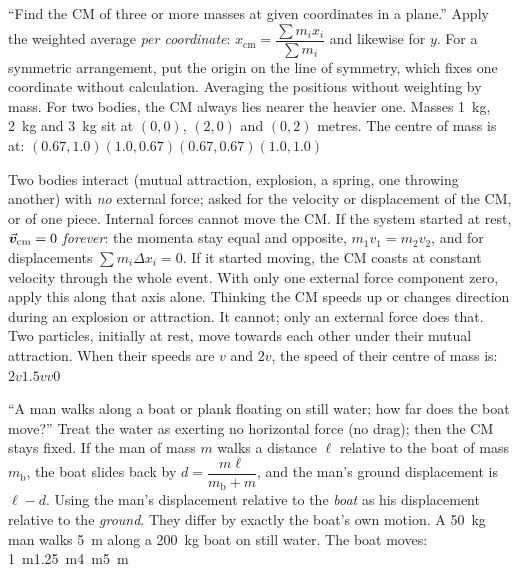{``Find the CM of three or more masses at given coordinates in a plane.''}
{Apply the weighted average \emph{per coordinate}:
$x_{\text{cm}}=\dfrac{\sum m_ix_i}{\sum m_i}$ and likewise for $y$. For a symmetric arrangement, put the
origin on the line of symmetry, which fixes one coordinate without calculation.}
{Averaging the positions without weighting by mass. For two bodies, the CM always lies nearer the heavier one.}
{Masses \SI{1}{kg}, \SI{2}{kg} and \SI{3}{kg} sit at $(0,0)$, $(2,0)$ and $(0,2)$ metres. The centre of
mass is at:}
{$(0.67,1.0)$}{$(1.0,0.67)$}{$(0.67,0.67)$}{$(1.0,1.0)$}

{Two bodies interact (mutual attraction, explosion, a spring, one throwing another) with \emph{no}
external force; asked for the velocity or displacement of the CM, or of one piece.}
{Internal forces cannot move the CM. If the system started at rest, $\vec{\bm{v}}_{\text{cm}}=0$ \emph{forever}:
the momenta stay equal and opposite, $m_1v_1=m_2v_2$, and for displacements $\sum m_i\Delta x_i=0$. If it
started moving, the CM coasts at constant velocity through the whole event. With only one external force
component zero, apply this along that axis alone.}
{Thinking the CM speeds up or changes direction during an explosion or attraction. It cannot; only an
external force does that.}
{Two particles, initially at rest, move towards each other under their mutual attraction. When their
speeds are $v$ and $2v$, the speed of their centre of mass is:}
{$2v$}{$1.5v$}{$v$}{$0$}

{``A man walks along a boat or plank floating on still water; how far does the boat move?''}
{Treat the water as exerting no horizontal force (no drag); then the CM stays fixed. If the man of mass $m$ walks a distance $\ell$
relative to the boat of mass $m_{\text{b}}$, the boat slides back by
$\boxed{d=\dfrac{m\ell}{m_{\text{b}}+m}}$, and the man's ground displacement is $\ell-d$.}
{Using the man's displacement relative to the \emph{boat} as his displacement relative to the
\emph{ground}. They differ by exactly the boat's own motion.}
{A \SI{50}{kg} man walks \SI{5}{m} along a \SI{200}{kg} boat on still water. The boat moves:}
{\SI{1}{m}}{\SI{1.25}{m}}{\SI{4}{m}}{\SI{5}{m}}

